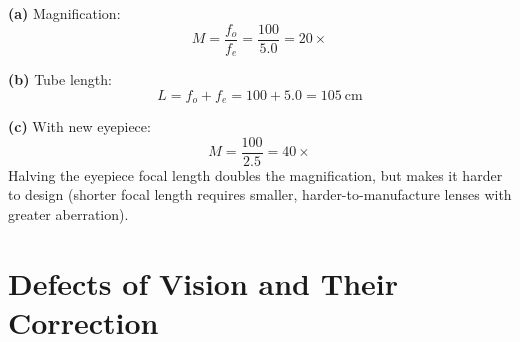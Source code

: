 \begin{solutionbox}
\textbf{(a)} Magnification:
\[
  M = \frac{f_o}{f_e} = \frac{100}{5.0} = 20\times
\]

\textbf{(b)} Tube length:
\[
  L = f_o + f_e = 100 + 5.0 = 105\ \text{cm}
\]

\textbf{(c)} With new eyepiece:
\[
  M = \frac{100}{2.5} = 40\times
\]
Halving the eyepiece focal length doubles the
magnification, but makes it harder to design (shorter
focal length requires smaller, harder-to-manufacture
lenses with greater aberration).
\end{solutionbox}

\section{Defects of Vision and Their Correction}

